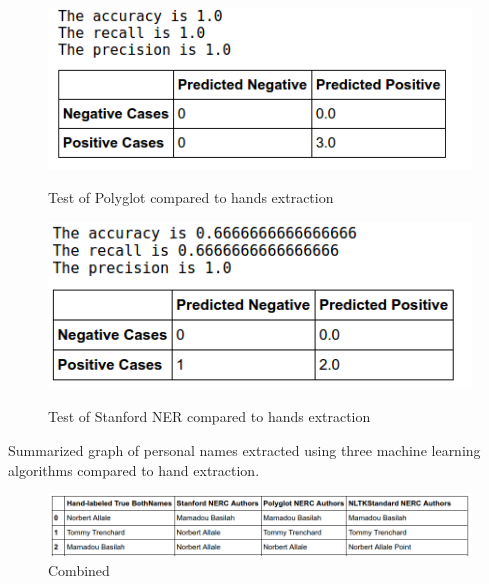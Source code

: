 \begin{figure}[hbtp]
\caption{Test of Polyglot compared to hands extraction}
\centering
\includegraphics[scale=1]{images/11.png}\label{prediction}
\end{figure}
\newpage 
\begin{figure}[hbtp]
\caption{Test of Stanford NER  compared to hands extraction}
\centering
\includegraphics[scale=1]{images/33.png}\label{prediction}
\end{figure} 

Summarized graph of personal names extracted using three machine learning algorithms compared to hand extraction.
\newpage
 
\begin{figure}[hbtp]
\caption{Combined}
\centering
\includegraphics[scale=.5]{images/6.png}
\end{figure}
